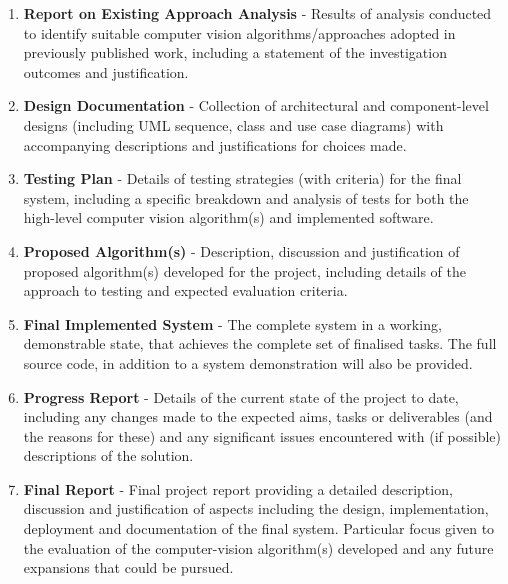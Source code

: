 \documentclass[10pt,fleqn,twoside]{article}
\begin{document}
\begin{enumerate}

	\item \textbf{Report on Existing Approach Analysis} - Results of analysis conducted to identify suitable computer vision algorithms/approaches adopted in previously published work, including a statement of the investigation outcomes and justification. 

	\item \textbf{Design Documentation} - Collection of architectural and component-level  designs (including UML sequence, class and use case diagrams) with accompanying descriptions and justifications for choices made.

	\item \textbf{Testing Plan} - Details of testing strategies (with criteria) for the final system, including a specific breakdown and analysis of tests for both the high-level computer vision algorithm(s) and implemented software.
	 
	\item \textbf{Proposed Algorithm(s)} -  Description, discussion and justification of proposed algorithm(s) developed for the project, including details of the approach to testing 	and expected evaluation criteria. 
	
	\item \textbf{Final Implemented System} - The complete system in a working, demonstrable state, that achieves the complete set of finalised tasks. The full source code, in addition to a system demonstration will also be provided.
	
	\item \textbf{Progress Report} - Details of the current state of the project to date, including any changes made to the expected aims, tasks or deliverables (and the reasons for these) and any significant issues encountered with (if possible) descriptions of the solution.

	\item \textbf{Final Report} - Final project report providing a detailed description, discussion and justification of aspects including the design, implementation, deployment and documentation of the final system. Particular focus given to the evaluation of the computer-vision algorithm(s) developed and any future expansions that could be pursued.
		


\end{enumerate}


\nocite{*} %
\end{document}
